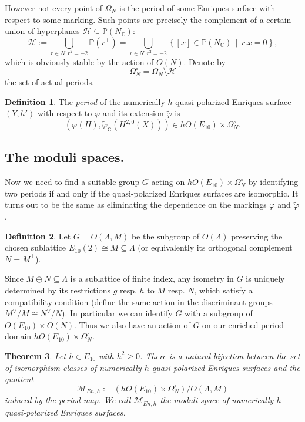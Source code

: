 \documentclass{amsart}
\theoremstyle{definition}
\newtheorem{definition}{Definition}[section]
\theoremstyle{plain}
\newtheorem{theorem}[definition]{Theorem}
\newcommand{\CC}{\mathbb{C}}
\newcommand{\PP}{\mathbb{P}}
\newcommand{\M}{\mathcal{M}}
\newcommand{\simon}[1]{\textcolor{magenta}{#1}}
\newcommand{\victor}[1]{\textcolor{red}{#1}}
\begin{document}
However not every point of $\Omega_N$ is the period of some Enriques surface with respect to some marking. Such points are precisely the complement of a certain union of hyperplanes $\mathcal{H}\subseteq\PP\left(N_{\CC}\right)$:
$$\mathcal{H}:=\bigcup_{r\in N,r^2=-2}\PP\left(r^{\perp}\right)=\bigcup_{r\in N,r^2=-2}\left\{\left[x\right]\in\PP\left(N_{\CC}\right)\,\mid\, r.x=0\right\},$$
which is obviously stable by the action of $O\left(N\right)$. Denote by
$$\Omega_N^\circ=\Omega_N\setminus\mathcal{H}$$
the set of actual periods.

\begin{definition}
    The \emph{period} of the numerically $h$-quasi polarized Enriques surface $(Y,h')$ with respect to $\varphi$ and its extension $\widetilde{\varphi}$ is
    \begin{equation} \label{eq:period}
    \left(\varphi\left(H\right),\widetilde{\varphi}_{\CC}\left(H^{2,0}(X)\right)\right)\in hO(E_{10})\times\Omega_N^\circ.
    \end{equation}
\end{definition}

\subsection*{The moduli spaces.}
Now we need to find a suitable group $G$ acting on $hO(E_{10})\times\Omega_N^\circ$ by identifying two periods if and only if the quasi-polarized Enriques surfaces are isomorphic.
It turns out to be the same as eliminating the dependence on the markings $\varphi$ and $\widetilde{\varphi}$.

\begin{definition}
    Let $G=O\left(\Lambda,M\right)$ be the subgroup of $O\left(\Lambda\right)$ preserving the chosen sublattice $E_{10}\left(2\right)\cong M\subseteq\Lambda$ (or equivalently its orthogonal complement $N=M^{\perp}$).
\end{definition}

Since $M\oplus N\subseteq\Lambda$ is a sublattice of finite index, any isometry in $G$ is uniquely determined by its restrictions $g$ resp. $h$ to $M$ resp. $N$, which satisfy a compatibility condition (define the same action in the discriminant groups $M^\vee/M \cong N^\vee/ N$). In particular we can identify $G$ with a subgroup of $O\left(E_{10}\right)\times O\left(N\right)$. Thus we also have an action of $G$ on our enriched period domain $hO(E_{10})\times\Omega_N^\circ$.
\begin{theorem}\label{thm:moduli}
    Let $h \in E_{10}$ with $h^2\geq 0$.
    There is a natural bijection between the set of isomorphism classes of numerically $h$-quasi-polarized Enriques surfaces %
    and the quotient
    \[\M_{En,h}:=  \left(hO(E_{10}) \times \Omega_N^\circ \right)/O\left(\Lambda,M\right)\]
    induced by the period map.
    We call $\M_{En,h}$ the moduli space of numerically $h$-quasi-polarized Enriques surfaces.
\end{theorem}
\end{document}
